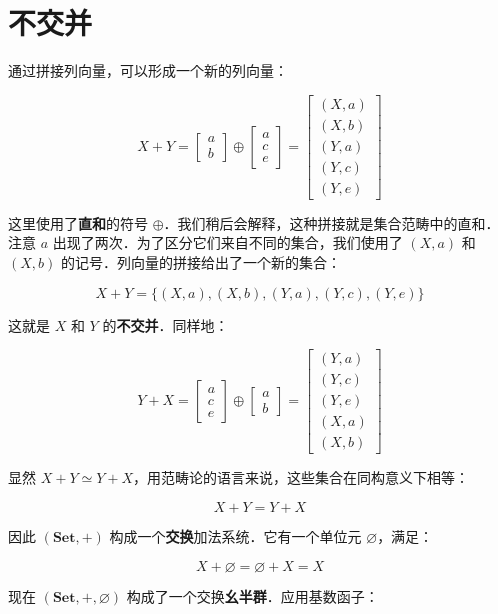 \documentclass[10pt, openany]{book}
\begin{document}
\section{不交并}

通过拼接列向量，可以形成一个新的列向量：

\[
X + Y = \begin{bmatrix}a\\b\end{bmatrix} \oplus \begin{bmatrix}a\\c\\e\end{bmatrix}
= \begin{bmatrix}(X,a)\\(X,b)\\(Y,a)\\(Y,c)\\(Y,e)\end{bmatrix}
\]

这里使用了\textbf{直和}的符号 $\oplus$．我们稍后会解释，这种拼接就是集合范畴中的直和．注意 $a$ 出现了两次．为了区分它们来自不同的集合，我们使用了 $(X,a)$ 和 $(X,b)$ 的记号．列向量的拼接给出了一个新的集合：

\[
X + Y = \{(X,a),(X,b),(Y,a),(Y,c),(Y,e)\}
\]

这就是 $X$ 和 $Y$ 的\textbf{不交并}．同样地：

\[
Y + X = \begin{bmatrix}a\\c\\e\end{bmatrix} \oplus \begin{bmatrix}a\\b\end{bmatrix} 
= \begin{bmatrix}(Y,a)\\(Y,c)\\(Y,e)\\(X,a)\\(X,b)\end{bmatrix}
\]

显然 $X + Y \simeq Y + X$，用范畴论的语言来说，这些集合在同构意义下相等：

\[
X + Y = Y + X
\]

因此 $(\textbf{Set},+)$ 构成一个\textbf{交换}加法系统．它有一个单位元 $\varnothing$，满足：

\[
X + \varnothing = \varnothing + X = X
\]

现在 $(\textbf{Set},+,\varnothing)$ 构成了一个交换\textbf{幺半群}．应用基数函子：
\end{document}
